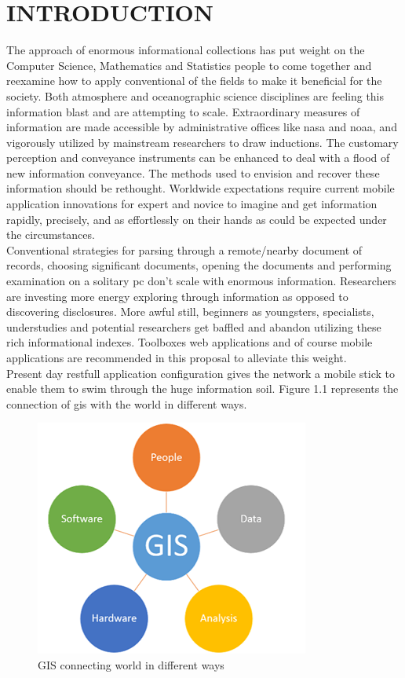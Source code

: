 \chapter{INTRODUCTION}
\label{chap:intro}


The approach of enormous informational collections has put weight on the Computer Science, Mathematics and Statistics people to come together and reexamine how to apply conventional of the fields to make it beneficial for the society. Both atmosphere and oceanographic science disciplines are feeling this information blast and are attempting to scale. Extraordinary measures of information are made accessible by administrative offices like \gls{nasa} and \gls{noaa}, and vigorously utilized by mainstream researchers to draw inductions. The customary perception and conveyance instruments can be enhanced to deal with a flood of new information conveyance. The methods used to envision and recover these information should be rethought. Worldwide expectations require current mobile application innovations for expert and novice to imagine and get information rapidly, precisely, and as effortlessly on their hands as could be expected under the circumstances. \\

Conventional strategies for parsing through a remote/nearby document of records, choosing significant documents, opening the documents and performing examination on a solitary \gls{pc} don't scale with enormous information. Researchers are investing more energy exploring through information as opposed to discovering disclosures. More awful still, beginners as youngsters, specialists, understudies and potential researchers get baffled and abandon utilizing these rich informational indexes. Toolboxes web applications and of course mobile applications are recommended in this proposal to alleviate this weight. \\

Present day \gls{restfull} application configuration gives the network a mobile stick to enable them to swim through the huge information soil. Figure 1.1 represents the connection of \gls{gis} with the world in different ways.

    \begin{figure}[H]
            \centering
            \includegraphics[width=0.50\linewidth]{figures/ch1/gis.png}
            \caption{\label{fig:gis_world} GIS connecting world in different ways}
    \end{figure}

